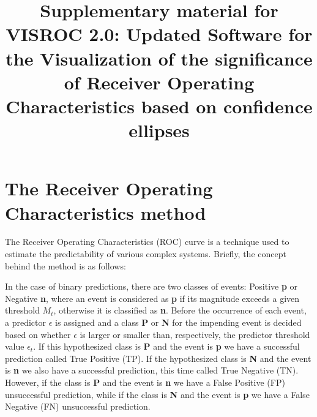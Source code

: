 \documentclass[preprint,12pt]{elsarticle}
\begin{document}
\newcommand{\onlinecite}[1]{\hspace{-1 ex} \nocite{#1}\citenum{#1}} 
\begin{frontmatter}


\title{Supplementary material for VISROC 2.0: Updated Software for the Visualization of the significance of Receiver Operating Characteristics based on confidence ellipses}

\end{frontmatter}
\section{The Receiver Operating Characteristics method}
\label{Intro}
The Receiver Operating Characteristics (ROC) curve is a technique used\cite{hosmer2000, GAR09A,NEWEPL,SPRINGER,CAR11,NAT11B,SARCHRIS12B,nhess12,sarlis2015,feng2022,sarlis2020,raffinetti2021} to estimate the predictability of various complex systems. Briefly, the concept behind the method is as follows\cite{FAW06}:

In the case of binary predictions, there are two classes of events: Positive {\bf p} or Negative {\bf n}, where an event is considered as {\bf p} if its magnitude exceeds a
given threshold $M_t$, otherwise it is classified as {\bf n}. Before the occurrence
of each event, a predictor $\epsilon$ is assigned and a class {\bf P} or {\bf N} for the impending event is decided based on whether $\epsilon$ is larger or smaller than,
respectively, the predictor threshold value $\epsilon_t$. If this hypothesized
class is {\bf P} and the event is {\bf p} we have a successful prediction called
True Positive (TP). If the hypothesized class is {\bf N} and the event is {\bf n} we also have a successful prediction, this time called True Negative (TN). However, if the class is {\bf P} and the event is {\bf n} we have a False Positive (FP) unsuccessful prediction, while if the class is {\bf N} and the event is {\bf p} we have a False Negative (FN) unsuccessful prediction. 
\end{document}
